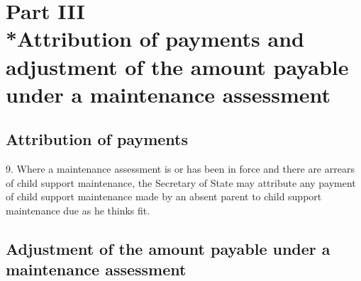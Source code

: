 \documentclass[12pt,a4paper]{article}
\begin{document}

\section[Part III --- Attribution of payments and adjustment of the amount payable under a maintenance assessment]{\sloppy Part III\\*Attribution of payments and adjustment of the amount payable under a maintenance assessment}

\renewcommand\parthead{--- Part III}

\subsection[9. Attribution of payments]{Attribution of payments}

9.  Where a maintenance assessment is or has been in force and there are arrears of child support maintenance, the Secretary of State may attribute any payment of child support maintenance made by an absent parent to child support maintenance due as he thinks fit.

\subsection[10. Adjustment of the amount payable under a maintenance assessment]{Adjustment of the amount payable under a maintenance assessment}
\end{document}
